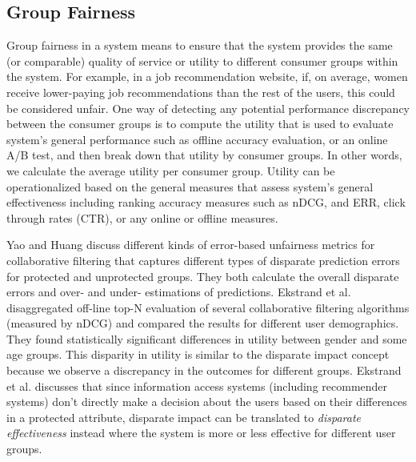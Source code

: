     \subsection{Group Fairness}
        Group fairness in a system means to ensure that the system provides the same (or comparable) quality of service or utility to different consumer groups within the system. For example, in a job recommendation website, if, on average, women receive lower-paying job recommendations than the rest of the users, this could be considered unfair. One way of detecting any potential performance discrepancy between the consumer groups is to compute the utility that is used to evaluate system's general performance such as offline accuracy evaluation, or an online A/B test, and then break down that utility by consumer groups. In other words, we calculate the average utility per consumer group. Utility can be operationalized based on the general measures that assess system's general effectiveness including ranking accuracy measures such as nDCG, and ERR, click through rates (CTR), or any online or offline measures.
    
        Yao and Huang \cite{yao_huang_fatml-2017} discuss different kinds of error-based unfairness metrics for collaborative filtering that captures different types of disparate prediction errors for protected and unprotected groups. They both calculate the overall disparate errors and over- and under- estimations of predictions. Ekstrand et al. \cite{ekstrand2018all} disaggregated off-line top-N evaluation of several collaborative filtering algorithms (measured by nDCG) and compared the results for different user demographics. They found statistically significant differences in utility between gender and some age groups. This disparity in utility is similar to the disparate impact concept because we observe a discrepancy in the outcomes for different groups. Ekstrand et al. \cite{ekstrand2021fairness} discusses that since information access systems (including recommender systems) don't directly make a decision about the users based on their differences in a protected attribute, disparate impact can be translated to \textit{disparate effectiveness} instead where the system is more or less effective for different user groups. 
    
